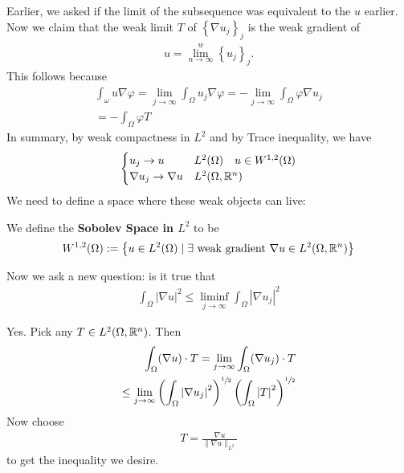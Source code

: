 \documentclass{memoir}
\begin{document}
Earlier, we asked if the limit of the subsequence was equivalent to the \(u\) earlier. Now we claim that the weak limit \(T\) of \(\left\{ \nabla u_j \right\}_j\) is the weak gradient of
 \begin{align*}
	u = \lim_{n \to \infty}^{w} \left\{ u_j \right\}_j .
\end{align*}
This follows because
\begin{align*}
	\int_\omega u \nabla \varphi = \lim_{j \to \infty} \int_\Omega u_j \nabla \varphi  = - \lim_{j \to \infty} \int_\Omega \varphi \nabla u_j\\
	= - \int_\Omega \varphi T
\end{align*}
In summary, by weak compactness in \(L^2\) and by Trace inequality, we have
\begin{align*}
	\begin{cases}
		u_j \to u & L^2(\Omega )\quad u \in W^{1,2}(\Omega )\\
		\nabla u_j \to \nabla u & L^2(\Omega ,\mathbb{R}^{n})
	\end{cases}
\end{align*}
We need to define a space where these weak objects can live:
\begin{defn}
	We define the \textbf{Sobolev Space in \(L^2\)} to be
	\begin{align*}
		W^{1,2}(\Omega ) := \left\{u \in L^2(\Omega ) \mid \exists  \text{ weak gradient }\nabla u \in L^2(\Omega ,\mathbb{R}^{n}) \right\} 
	\end{align*}
\end{defn}

Now we ask a new question: is it true that
\begin{align*}
	\int_\Omega \left| \nabla u \right|^2 \leq \liminf_{j \to \infty} \int_\Omega  \left| \nabla u_j \right|^2
\end{align*}

Yes. Pick any \(T \in L^2(\Omega ,\mathbb{R}^{n})\). Then
\begin{align*}
	\int_\Omega (\nabla u) \cdot T = \lim_{j \to \infty} \int_\Omega (\nabla u_j) \cdot T\\
	\leq \lim_{j \to \infty} \left( \int_\Omega \left| \nabla u_j \right|^2 \right)^{ \sfrac{1}{2}} \left( \int_{\Omega } \left| T \right|^2 \right)^{ \sfrac{1}{2}}
\end{align*}
Now choose
\begin{align*}
	T = \frac{\nabla u}{\|\nabla u\|_{L^2}}
\end{align*}
to get the inequality we desire.\\
\end{document}
